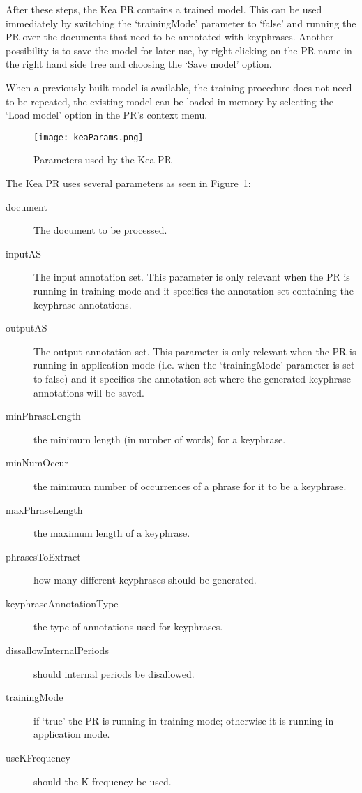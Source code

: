 After these steps, the Kea PR contains a trained model. This can be used
immediately by switching the `trainingMode' parameter to `false' and running the
PR over the documents that need to be annotated with keyphrases. Another
possibility is to save the model for later use, by right-clicking on the PR name
in the right hand side tree and choosing the `Save model' option.

When a previously built model is available, the training procedure does not
need to be repeated, the existing model can be loaded in memory by selecting
the `Load model' option in the PR's context menu.
\begin{figure}
\texttt{[image: keaParams.png]}
\caption{Parameters used by the Kea PR}
\label{fig:keaParams}
\end{figure}

The Kea PR uses several parameters as seen in Figure~\ref{fig:keaParams}:
\begin{description}
\item[document] The document to be processed.
\item[inputAS] The input annotation set. This parameter is only relevant when
the PR is running in training mode and it specifies the annotation set containing
the keyphrase annotations.
\item[outputAS] The output annotation set. This parameter is only relevant when
the PR is running in application mode (i.e. when the `trainingMode' parameter is
set to false) and it specifies the annotation set where the generated keyphrase
annotations will be saved.
\item[minPhraseLength] the minimum length (in number of words) for a keyphrase.
\item[minNumOccur] the minimum number of occurrences of a phrase for it to be a
keyphrase.
\item[maxPhraseLength] the maximum length of a keyphrase.
\item[phrasesToExtract] how many different keyphrases should be generated.
\item[keyphraseAnnotationType] the type of annotations used for keyphrases.
\item[dissallowInternalPeriods] should internal periods be disallowed.
\item[trainingMode] if `true' the PR is running in training mode; otherwise it
is running in application mode.
\item[useKFrequency] should the K-frequency be used.
\end{description}


